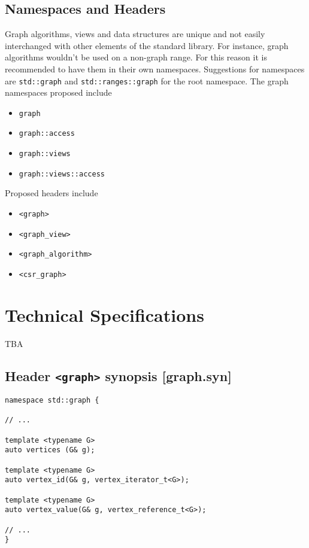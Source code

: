 \documentclass[10pt,onecolumn]{article}
\newcommand{\tcode}[1]{\lstinline{#1}}
\begin{document}
\subsection{Namespaces and Headers}
Graph algorithms, views and data structures are unique and not easily interchanged with other elements of the standard library. For
instance, graph algorithms wouldn't be used on a non-graph range. For this reason it is recommended to have them in their own 
namespaces. Suggestions for namespaces are \tcode{std::graph} and
\tcode{std::ranges::graph} for the root namespace. The graph namespaces proposed include
\begin{itemize}
\item[]\tcode{graph}
\item[]\tcode{graph::access}
\item[]\tcode{graph::views}
\item[]\tcode{graph::views::access}
\end{itemize}

Proposed headers include
\begin{itemize}
\item[]\tcode{<graph>}
\item[]\tcode{<graph_view>}
\item[]\tcode{<graph_algorithm>}
\item[]\tcode{<csr_graph>}
\end{itemize}

\section{Technical Specifications}
TBA

\subsection{Header \tcode{<graph>} synopsis [graph.syn]}

\begin{lstlisting}
namespace std::graph {

// ...

template <typename G>
auto vertices (G& g);

template <typename G>
auto vertex_id(G& g, vertex_iterator_t<G>);

template <typename G>
auto vertex_value(G& g, vertex_reference_t<G>);

// ...
}
\end{lstlisting}

\vspace{10pt}
\end{document}
